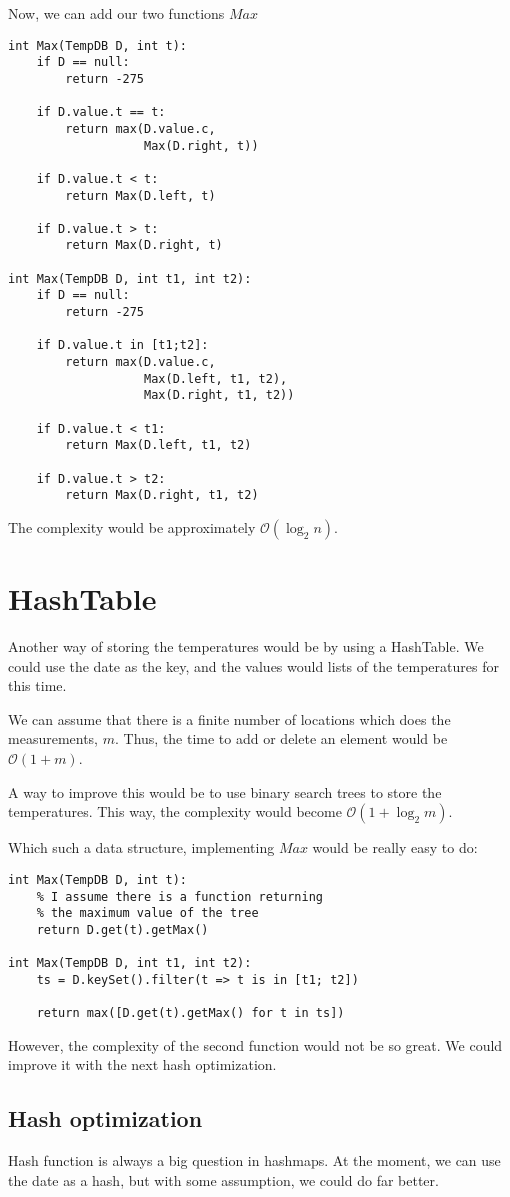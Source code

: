 	Now, we can add our two functions $Max$

\begin{lstlisting}
int Max(TempDB D, int t):
	if D == null:
		return -275

	if D.value.t == t:
		return max(D.value.c, 
				   Max(D.right, t))

	if D.value.t < t:
		return Max(D.left, t)

	if D.value.t > t:
		return Max(D.right, t)	

int Max(TempDB D, int t1, int t2):
	if D == null:
		return -275

	if D.value.t in [t1;t2]:
		return max(D.value.c, 
				   Max(D.left, t1, t2), 
				   Max(D.right, t1, t2))

	if D.value.t < t1:
		return Max(D.left, t1, t2)

	if D.value.t > t2:
		return Max(D.right, t1, t2)
\end{lstlisting}
The complexity would be approximately $\mathcal{O}(\log_2n)$.

\section{HashTable}
	Another way of storing the temperatures would be by using a HashTable.
	We could use the date as the key, and the values would lists of the temperatures for this time.

	We can assume that there is a finite number of locations which does the measurements, $m$.
	Thus, the time to add or delete an element would be $\mathcal{O}(1+m)$.

	A way to improve this would be to use binary search trees to store the temperatures. This way, the complexity would become  $\mathcal{O}(1+\log_2m)$.

	Which such a data structure, implementing $Max$ would be really easy to do:
\begin{lstlisting}
int Max(TempDB D, int t):
	% I assume there is a function returning 
	% the maximum value of the tree
	return D.get(t).getMax() 

int Max(TempDB D, int t1, int t2):
	ts = D.keySet().filter(t => t is in [t1; t2])

	return max([D.get(t).getMax() for t in ts])
\end{lstlisting}

	However, the complexity of the second function would not be so great. We could improve it with the next hash optimization.

	\subsection{Hash optimization}
		Hash function is always a big question in hashmaps. At the moment, we can use the date as a hash, but with some assumption, we could do far better.

